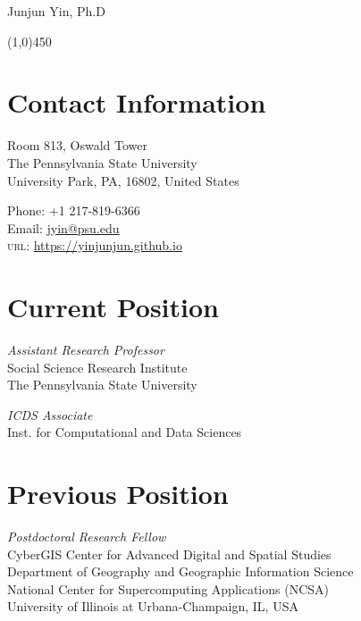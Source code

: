 \documentclass[11pt, a4paper]{article}
\begin{document}
{\LARGE Junjun Yin, Ph.D}
\begin{center}
\line(1,0){450}
\end{center}
\section*{Contact Information}

\begin{multicols}{2}
 \begin{flushleft}
Room 813, Oswald Tower\\
The Pennsylvania State University\\
University Park, PA, 16802, United States
\end{flushleft}
\columnbreak
\begin{flushright}
Phone: +1 217-819-6366\\[.1cm]
Email: \href{mailto:a.jyin@psu.edu}{jyin@psu.edu}\\[.1cm]
\textsc{url}: \href{https://yinjunjun.github.io}{https://yinjunjun.github.io}
\end{flushright}
\end{multicols}


\section*{Current Position}
\begin{multicols}{2}
 \begin{flushleft}
\emph{Assistant Research Professor}\\
Social Science Research Institute\\
The Pennsylvania State University\\
\end{flushleft}
\columnbreak
\begin{flushright}
\emph{ICDS Associate}\\
Inst. for Computational and  Data Sciences\\
\end{flushright}
\end{multicols}

\section*{Previous Position}
\emph{Postdoctoral Research Fellow}\\
CyberGIS Center for Advanced Digital and Spatial Studies\\
Department of Geography and Geographic Information Science\\
National Center for Supercomputing Applications (NCSA)\\
University of Illinois at Urbana-Champaign, IL, USA
\end{document}
